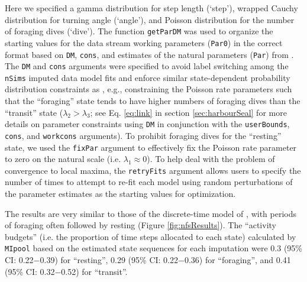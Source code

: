 \documentclass[12pt]{article}\usepackage[]{graphicx}\usepackage[]{color}
\begin{document}
Here we specified a gamma distribution for step length (`step'), wrapped Cauchy distribution for turning angle (`angle'), and Poisson distribution for the number of foraging dives (`dive'). The function \verb|getParDM| was used to organize the starting values for the data stream working parameters (\verb|Par0|) in the correct format based on \verb|DM|, \verb|cons|, and estimates of the natural parameters (\verb|Par|) from \cite{McClintockEtAl2014b}. The \verb|DM| and \verb|cons| arguments were specified to avoid label switching among the \verb|nSims| imputed data model fits and enforce similar state-dependent probability distribution constraints as \cite{McClintockEtAl2014b}, e.g., constraining the Poisson rate parameters such that the ``foraging'' state tends to have higher numbers of foraging dives than the ``transit'' state ($\lambda_2 > \lambda_3$; see Eq. \ref{eq:link} in section \ref{sec:harbourSeal} for more details on parameter constraints using \verb|DM| in conjunction with the \verb|userBounds|, \verb|cons|, and \verb|workcons| arguments). To prohibit foraging dives for the ``resting'' state, we used the \verb|fixPar| argument to effectively fix the Poisson rate parameter to zero on the natural scale (i.e. $\lambda_1 \approx 0$).  To help deal with the problem of convergence to local maxima, the \verb|retryFits| argument allows users to specify the number of times to attempt to re-fit each model using random perturbations of the parameter estimates as the starting values for optimization.

The results are very similar to those of the discrete-time model of \cite{McClintockEtAl2014b}, with periods of foraging often followed by resting (Figure \ref{fig:nfsResults}).  The ``activity budgets'' (i.e. the proportion of time steps allocated to each state) calculated by \verb|MIpool| based on the estimated state sequences for each imputation were 0.3 (95\% CI: 0.22$-$0.39) for ``resting'', 0.29 (95\% CI: 0.22$-$0.36) for ``foraging'', and 0.41 (95\% CI: 0.32$-$0.52) for ``transit''.
\end{document}
